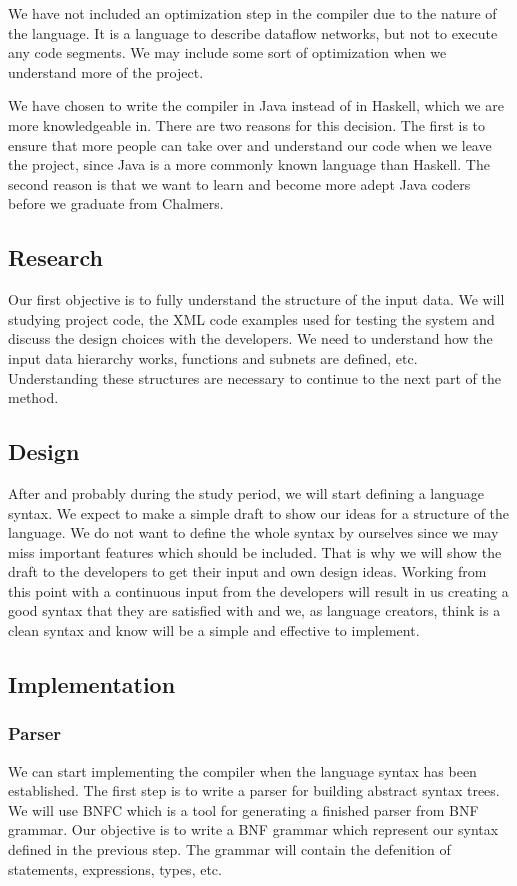 \documentclass[a4paper]{article}
\begin{document}
We have not included an optimization step in the compiler due to the
nature of the language. It is a language to describe dataflow
networks, but not to execute any code segments. We may include some
sort of optimization when we understand more of the project.

We have chosen to write the compiler in Java instead of in Haskell,
which we are more knowledgeable in. There are two reasons for this
decision. The first is to ensure that more people can take over and
understand our code when we leave the project, since Java is a more
commonly known language than Haskell. The second reason is that we
want to learn and become more adept Java coders before we graduate
from Chalmers.


\subsection{Research}
Our first objective is to fully understand the structure of the input
data. We will studying project code, the XML code examples used for
testing the system and discuss the design choices with the
developers. We need to understand how the input data hierarchy works,
functions and subnets are defined, etc. Understanding these structures
are necessary to continue to the next part of the method.

\subsection{Design}
After and probably during the study period, we will start defining a
language syntax. We expect to make a simple draft to show our ideas
for a structure of the language. We do not want to define the whole
syntax by ourselves since we may miss important features which should
be included. That is why we will show the draft to the developers to
get their input and own design ideas. Working from this point with a
continuous input from the developers will result in us creating a good
syntax that they are satisfied with and we, as language creators,
think is a clean syntax and know will be a simple and effective to
implement.

\subsection{Implementation}
\subsubsection{Parser}
We can start implementing the compiler when the language syntax has
been established. The first step is to write a parser for building
abstract syntax trees. We will use BNFC which is a tool for generating
a finished parser from BNF grammar. Our objective is to write a BNF
grammar which represent our syntax defined in the previous step. The
grammar will contain the defenition of statements, expressions, types,
etc.
\end{document}
